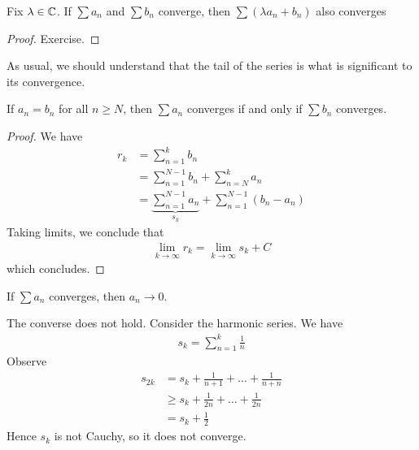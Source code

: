 \documentclass{../../template/note}
\begin{document}
    \begin{lemma}
        Fix \(\lambda \in \mathbb C\). If \(\sum a_n\) and \(\sum b_n\) converge, then \(\sum(\lambda a_n + b_n)\) also converges
    \end{lemma}
    
    \begin{proof}
        Exercise.
    \end{proof}
    
    As usual, we should understand that the tail of the series is what is significant to its convergence.

    \begin{lemma}
        If \(a_n = b_n\) for all \(n \geq N\), then \(\sum a_n\) converges if and only if \(\sum b_n\) converges.
    \end{lemma}
    
    \begin{proof}
        We have
        \begin{align*}
            r_k &= \sum_{n=1}^k b_n \\
            &= \sum_{n=1}^{N-1} b_n + \sum_{n=N}^k a_n \\
            &= \underbrace{\sum_{n=1}^{N-1} a_n}_{s_k} + \sum_{n=1}^{N-1} (b_n-a_n)
        \end{align*}
        Taking limits, we conclude that
        \begin{align*}
            \lim_{k \to \infty} r_k = \lim_{k \to \infty} s_k + C
        \end{align*}
        which concludes.        
    \end{proof}
    
    \begin{proposition}
        If \(\sum a_n\) converges, then \(a_n \to 0\).
    \end{proposition}
    
    \begin{remark}
        The converse does not hold. Consider the harmonic series. We have
        \begin{align*}
            s_k = \sum_{n=1}^k \frac 1 n
        \end{align*}
        Observe
        \begin{align*}
            s_{2k} &= s_k + \frac{1}{n+1} + \dots + \frac{1}{n+n} \\
            &\geq s_k + \frac 1 {2n} + \dots + \frac 1 {2n} \\
            &= s_k + \frac{1}{2}
        \end{align*}
        Hence \(s_k\) is not Cauchy, so it does not converge.
    \end{remark}
    
\end{document}
